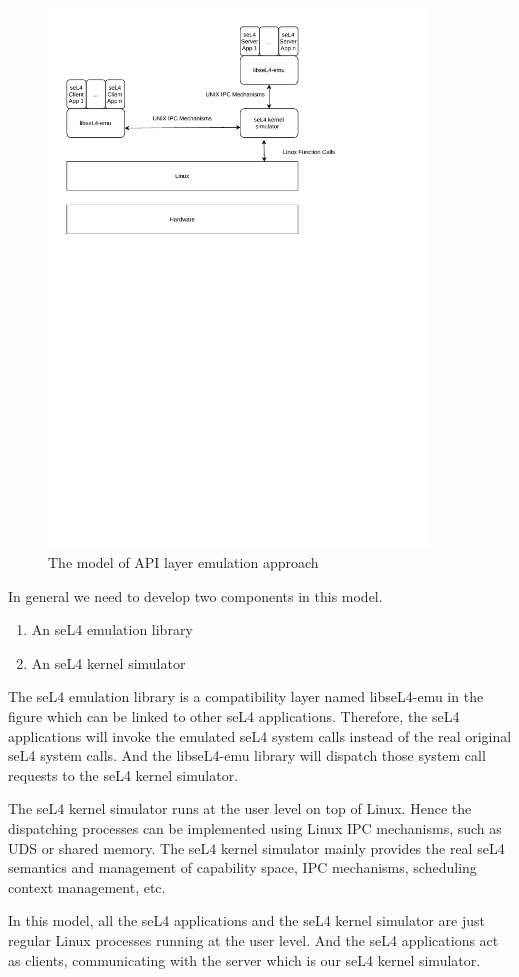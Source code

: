 \begin{figure}[h]
    \centering
    \includegraphics[clip, trim=0.5cm 16cm 3cm 0.5cm, width=0.9\textwidth, height=0.8\textwidth]{ch3/model1-v3.pdf}
    \caption{The model of API layer emulation approach}
    \label{fig:mapi}
\end{figure}

In general we need to develop two components in this model. 

\begin{enumerate}
\item An seL4 emulation library
\item An seL4 kernel simulator
\end{enumerate}

The seL4 emulation library is a compatibility layer named libseL4-emu in the figure which can be linked to other seL4 applications. Therefore, the seL4 applications will invoke the emulated seL4 system calls instead of the real original seL4 system calls. And the libseL4-emu library will dispatch those system call requests to the seL4 kernel simulator. 

The seL4 kernel simulator runs at the user level on top of Linux. Hence the dispatching processes can be implemented using Linux IPC mechanisms, such as UDS or shared memory. The seL4 kernel simulator mainly provides the real seL4 semantics and management of capability space, IPC mechanisms, scheduling context management, etc. 

In this model, all the seL4 applications and the seL4 kernel simulator are just regular Linux processes running at the user level. And the seL4 applications act as clients, communicating with the server which is our seL4 kernel simulator. 

